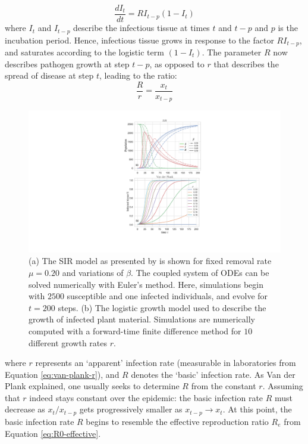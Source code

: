 \begin{equation}
\label{van-plank-incubation}
    \frac{dI_t}{dt} = RI_{t-p}(1 - I_{t})
\end{equation}
where $I_t$ and $I_{t-p}$ describe the infectious tissue at times $t$ and $t-p$ and $p$ is the incubation period. 
Hence, infectious tissue grows in response to the factor $R I_{t-p}$, and saturates
according to the logistic term $(1 - I_t)$. The parameter $R$ now describes pathogen
growth at step $t-p$, as opposed to $r$ that describes the spread of disease at step $t$, leading to the ratio:
\begin{equation}
    \frac{R}{r} = \frac{x_t}{x_{t-p}}
\end{equation}
\begin{figure}
     \centering
     \includegraphics[scale=0.55]{chapter2/figures/SIR-vs-Plank.pdf}
     \caption{(a) The SIR model as presented by \cite{kermack-model} is shown for fixed removal rate $\mu = 0.20$ and variations of $\beta$. 
                  The coupled system of ODEs can be solved numerically with Euler's method. Here, simulations begin with 
                  $2500$ susceptible and one infected individuals, and evolve for $t=200$ steps.
                  (b) The logistic growth model \cite{van2013plant} used to describe the growth of infected plant material.
                  Simulations are numerically computed with a forward-time finite difference method for $10$ different growth rates $r$.
       } 
     \label{fig:SIR-vs-plank}
 \end{figure}
where $r$ represents an `apparent' infection rate (measurable in laboratories from Equation \ref{eq:van-plank-r}),
and $R$ denotes the `basic' infection rate. As Van der Plank explained, one usually seeks
to determine $R$ from the constant $r$. Assuming that $r$ indeed stays constant over the epidemic:
the basic infection rate $R$ must decrease as $x_t/x_{t-p}$ gets progressively smaller as $x_{t-p}\rightarrow x_t $.
At this point, the basic infection rate $R$ begins to resemble the effective reproduction ratio $R_e$
from Equation \ref{eq:R0-effective}. 

